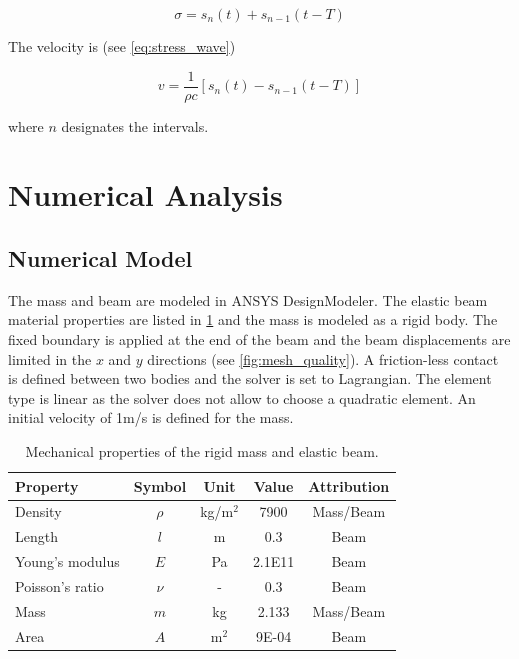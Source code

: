 \documentclass{article}
\begin{document}
\begin{equation}
    \sigma = s_n(t) + s_{n-1}(t-T)
\end{equation}

The velocity is (see \cref{eq:stress_wave})

\begin{equation}
    v = \frac{1}{\rho c} [s_n(t) - s_{n-1}(t-T)]
\end{equation}

where $n$ designates the intervals.

\section{Numerical Analysis}
\subsection{Numerical Model}
The mass and beam are modeled in ANSYS DesignModeler. The elastic beam material properties are listed in \cref{tab:mat_prop} and the mass is modeled as a rigid body. The fixed boundary is applied at the end of the beam and the beam displacements are limited in the $x$ and $y$ directions (see \cref{fig:mesh_quality}). A friction-less contact is defined between two bodies and the solver is set to Lagrangian. The element type is linear as the solver does not allow to choose a quadratic element. An initial velocity of 1m/s is defined for the mass.

\begin{table}[H]
    \centering
    \caption{Mechanical properties of the rigid mass and elastic beam.}
    \begin{tabular}{l c c c c} \hline
        Property & Symbol & Unit & Value & Attribution \\ \hline
        Density & $\rho$ & kg/m$^2$ & 7900& Mass/Beam \\
        Length & $l$ & m & 0.3 & Beam \\
        Young's modulus & $E$& Pa & 2.1E11 & Beam \\
        Poisson's ratio & $\nu$ & - & 0.3 & Beam \\
        Mass & $m$ & kg & 2.133 & Mass/Beam \\
        Area & $A$ & m$^2$ & 9E-04 & Beam \\ \hline
    \end{tabular} 
    \label{tab:mat_prop}
\end{table}
\end{document}
